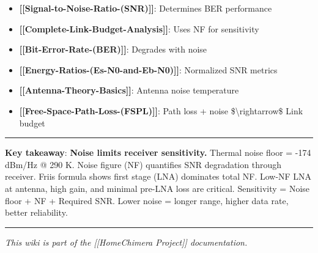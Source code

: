\begin{itemize}
\tightlist
\item
  \textbf{{[}{[}Signal-to-Noise-Ratio-(SNR){]}{]}}: Determines BER
  performance
\item
  \textbf{{[}{[}Complete-Link-Budget-Analysis{]}{]}}: Uses NF for
  sensitivity
\item
  \textbf{{[}{[}Bit-Error-Rate-(BER){]}{]}}: Degrades with noise
\item
  \textbf{{[}{[}Energy-Ratios-(Es-N0-and-Eb-N0){]}{]}}: Normalized SNR
  metrics
\item
  \textbf{{[}{[}Antenna-Theory-Basics{]}{]}}: Antenna noise temperature
\item
  \textbf{{[}{[}Free-Space-Path-Loss-(FSPL){]}{]}}: Path loss + noise
  \$\textbackslash rightarrow\$ Link budget
\end{itemize}

\begin{center}\rule{0.5\linewidth}{0.5pt}\end{center}

\textbf{Key takeaway}: \textbf{Noise limits receiver sensitivity.}
Thermal noise floor = -174 dBm/Hz @ 290 K. Noise figure (NF) quantifies
SNR degradation through receiver. Friis formula shows first stage (LNA)
dominates total NF. Low-NF LNA at antenna, high gain, and minimal
pre-LNA loss are critical. Sensitivity = Noise floor + NF + Required
SNR. Lower noise = longer range, higher data rate, better reliability.

\begin{center}\rule{0.5\linewidth}{0.5pt}\end{center}

\emph{This wiki is part of the {[}{[}Home\textbar Chimera Project{]}{]}
documentation.}
